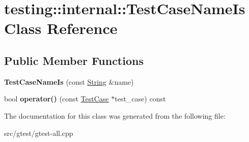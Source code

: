 \hypertarget{classtesting_1_1internal_1_1_test_case_name_is}{}\section{testing\+:\+:internal\+:\+:Test\+Case\+Name\+Is Class Reference}
\label{classtesting_1_1internal_1_1_test_case_name_is}
\subsection*{Public Member Functions}
\begin{DoxyCompactItemize}
\item 
\mbox{\label{classtesting_1_1internal_1_1_test_case_name_is_aba668706e1635e699c5ac1ccaa2994ea}} 
{\bfseries Test\+Case\+Name\+Is} (const \mbox{\hyperlink{classtesting_1_1internal_1_1_string}{String}} \&name)
\item 
\mbox{\label{classtesting_1_1internal_1_1_test_case_name_is_aa96c4e9facbaa7043c8f0b34465d1eae}} 
bool {\bfseries operator()} (const \mbox{\hyperlink{classtesting_1_1_test_case}{Test\+Case}} $\ast$test\+\_\+case) const
\end{DoxyCompactItemize}


The documentation for this class was generated from the following file\+:\begin{DoxyCompactItemize}
\item 
src/gtest/gtest-\/all.\+cpp\end{DoxyCompactItemize}
